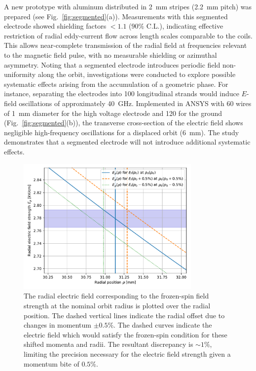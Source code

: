 \begin{refsection}
        \noindent
        A new prototype with aluminum distributed in \SI{2}{mm} stripes (\SI{2.2}{mm} pitch) was prepared (see Fig.~\ref{fig:segmented}(a)). 
        Measurements with this segmented electrode showed shielding factors $<1.1$ ($90\%$ C.L.), indicating effective restriction of radial eddy-current flow across length scales comparable to the coils. 
        This allows near-complete transmission of the radial field at frequencies relevant to the magnetic field pulse, with no measurable shielding or azimuthal asymmetry.
        Noting that a segmented electrode introduces periodic field non-uniformity along the orbit, investigations were conducted to explore possible systematic effects arising from the accumulation of a geometric phase. 
        For instance, separating the electrodes into 100 longitudinal strands would induce $E$-field oscillations of approximately \SI{40}{\giga\hertz}.
        Implemented in ANSYS with 60 wires of \SI{1}{mm} diameter for the high voltage electrode and 120 for the ground (Fig.~\ref{fig:segmented}(b)), the transverse cross-section of the electric field shows negligible high-frequency oscillations for a displaced orbit (\SI{6}{mm}). The study demonstrates that a segmented electrode will not introduce additional systematic effects.
        
        \begin{figure}
            \centering
            \includegraphics[width=0.8\textwidth]{Figures/muEDM/Electrode/ElectricField.pdf}
            \caption{The radial electric field corresponding to the frozen-spin field strength at the nominal orbit radius is plotted over the radial position. The dashed vertical lines indicate the radial offset due to changes in momentum $\pm0.5\%$. The dashed curves indicate the electric field which would satisfy the frozen-spin condition for these shifted momenta and radii. The resultant discrepancy is $\sim1\%$, limiting the precision necessary for the electric field strength given a momentum bite of $0.5\%$.}
            \label{fig:efieldprecision}
        \end{figure}
        

\end{refsection}

